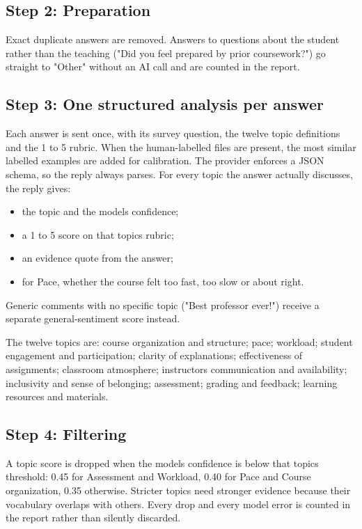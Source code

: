 \documentclass[
  11pt,
]{article}
\providecommand{\tightlist}{%
  \setlength{\itemsep}{0pt}\setlength{\parskip}{0pt}}
\begin{document}
\subsection{Step 2: Preparation}\label{step-2-preparation}

Exact duplicate answers are removed. Answers to questions about the student
rather than the teaching ("Did you feel prepared by prior coursework?") go
straight to "Other" without an AI call and are counted in the report.

\subsection{Step 3: One structured analysis per
answer}\label{step-3-one-structured-analysis-per-answer}

Each answer is sent once, with its survey question, the twelve topic definitions
and the 1 to 5 rubric. When the human-labelled files are present, the most
similar labelled examples are added for calibration. The provider enforces a
JSON schema, so the reply always parses. For every topic the answer actually
discusses, the reply gives:

\begin{itemize}
\tightlist
\item
  the topic and the model\textquotesingle s confidence;
\item
  a 1 to 5 score on that topic\textquotesingle s rubric;
\item
  an evidence quote from the answer;
\item
  for Pace, whether the course felt too fast, too slow or about right.
\end{itemize}

Generic comments with no specific topic ("Best professor ever!") receive a
separate general-sentiment score instead.

The twelve topics are: course organization and structure; pace; workload;
student engagement and participation; clarity of explanations; effectiveness of
assignments; classroom atmosphere; instructor\textquotesingle s communication
and availability; inclusivity and sense of belonging; assessment; grading and
feedback; learning resources and materials.

\subsection{Step 4: Filtering}\label{step-4-filtering}

A topic score is dropped when the model\textquotesingle s confidence is below
that topic\textquotesingle s threshold: 0.45 for Assessment and Workload, 0.40
for Pace and Course organization, 0.35 otherwise. Stricter topics need stronger
evidence because their vocabulary overlaps with others. Every drop and every
model error is counted in the report rather than silently discarded.
\end{document}
